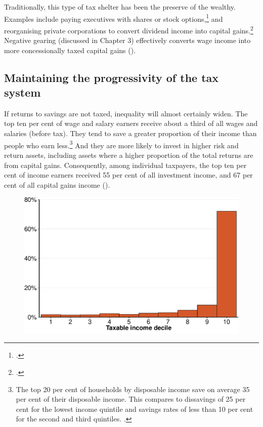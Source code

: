 Traditionally, this type of tax shelter has been the preserve of the wealthy. Examples include paying executives with shares or stock options,\footcite[][8--9]{Ingles2009TaxEquity} and reorganising private corporations to convert dividend income into capital gains.\footcite{MinasLim2013} Negative gearing (discussed in Chapter 3) effectively converts wage income into more concessionally taxed capital gains ().  

\subsection{Maintaining the progressivity of the tax system}\label{subsec:maintaining-progressivity-tax-system}
If returns to savings are not taxed, inequality will almost certainly widen. The top ten per cent of wage and salary earners receive about a third of all wages and salaries (before tax). They tend to save a greater proportion of their income than people who earn less.\footnote{The top 20 per cent of households by disposable income save on average 35 per cent of their disposable income. This compares to dissavings of 25 per cent for the lowest income quintile and savings rates of less than 10 per cent for the second and third quintiles. \textcite[][table~5]{ABS2014DistributionHouseholdIncome}.} And they are more likely to invest in higher risk and return assets, including assets where a higher proportion of the total returns are from capital gains. Consequently, among individual taxpayers, the top ten per cent of income earners received 55 per cent of all investment income, and 67 per cent of all capital gains income (). 

\begin{figure}[!ht]
\label{fig:CG-by-decile}

\includegraphics[width=\columnwidth]{CGT-NG-atlas//CG-by-decile-1}
\end{figure}

